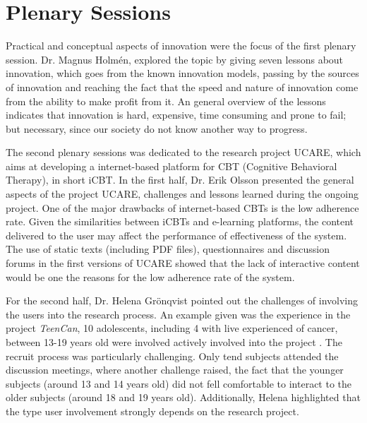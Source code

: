 \section*{Plenary Sessions}


Practical and conceptual aspects of innovation were the focus of the first plenary session. 
Dr. Magnus Holm\'{e}n, explored the topic by giving seven lessons about innovation, which goes from the known innovation models, passing by the sources of innovation and reaching the fact that the speed and nature of innovation come from the ability to make profit from it. 
An general overview of the lessons indicates that innovation is hard, expensive, time consuming and prone to fail; but necessary, since our society do not know another way to progress.


The second plenary sessions was dedicated to the research project UCARE, which aims at developing a internet-based platform for CBT (Cognitive Behavioral Therapy), in short iCBT. 
In the first half, Dr. Erik Olsson presented the general aspects of the project UCARE, challenges and lessons learned during the ongoing project. 
One of the major drawbacks of internet-based CBTs is the low adherence rate. 
Given the similarities between iCBTs and e-learning platforms, the content delivered to the user may affect the performance of effectiveness of the system. 
The use of static texts (including PDF files), questionnaires and discussion forums in the first versions of UCARE showed that the lack of interactive content would be one the reasons for the low adherence rate of the system.

For the second half, Dr. Helena Grönqvist pointed out the challenges of involving the users into the research process. 
An example given was the experience in the project \textit{TeenCan}, 10 adolescents, including 4 with live experienced of cancer, between 13-19 years old were involved actively involved into the project . 
The recruit process was particularly challenging. 
Only tend subjects attended the discussion meetings, where another challenge raised, the fact that the younger subjects (around 13 and 14 years old) did not fell comfortable to interact to the older subjects (around 18 and 19 years old). 
Additionally, Helena highlighted that the type user involvement strongly depends on the research project.


